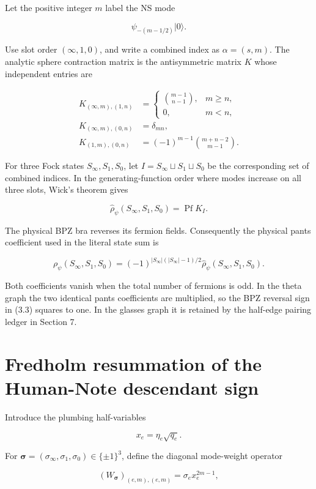 \documentclass[11pt]{article}
\begin{document}
Let the positive integer \(m\) label the NS mode

\[
 \psi_{-(m-1/2)}|0\rangle.
\]

Use slot order \((\infty,1,0)\), and write a combined index as
\(\alpha=(s,m)\).  The analytic sphere contraction matrix is the
antisymmetric matrix \(K\) whose independent entries are

\[
\begin{aligned}
K_{(\infty,m),(1,n)}
 &=\begin{cases}
   \binom{m-1}{n-1},&m\ge n,\\[2mm]0,&m<n,
   \end{cases}\\
K_{(\infty,m),(0,n)}&=\delta_{mn},\\
K_{(1,m),(0,n)}
 &=(-1)^{m-1}\binom{m+n-2}{m-1}.
\end{aligned}
\tag{3.1}
\]

For three Fock states \(S_\infty,S_1,S_0\), let
\(I=S_\infty\sqcup S_1\sqcup S_0\) be the corresponding set of combined
indices.  In the generating-function order where modes increase on all three
slots, Wick's theorem gives

\[
 \widehat\rho_\psi(S_\infty,S_1,S_0)=\operatorname{Pf}K_I.
\tag{3.2}
\]

The physical BPZ bra reverses its fermion fields.  Consequently the physical
pants coefficient used in the literal state sum is

\[
 \rho_\psi(S_\infty,S_1,S_0)
 =(-1)^{|S_\infty|(|S_\infty|-1)/2}
  \widehat\rho_\psi(S_\infty,S_1,S_0).
\tag{3.3}
\]

Both coefficients vanish when the total number of fermions is odd.  In the
theta graph the two identical pants coefficients are multiplied, so the BPZ
reversal sign in (3.3) squares to one.  In the glasses graph it is retained
by the half-edge pairing ledger in Section 7.

\section{Fredholm resummation of the Human-Note descendant sign}

Introduce the plumbing half-variables

\[
 x_e=\eta_e\sqrt{q_e}.
\tag{4.1}
\]

For \(\boldsymbol\sigma=(\sigma_\infty,\sigma_1,\sigma_0)\in
\{\pm1\}^3\), define the diagonal mode-weight operator

\[
 (W_{\boldsymbol\sigma})_{(e,m),(e,m)}
 =\sigma_e x_e^{2m-1},
\tag{4.2}
\]
\end{document}
